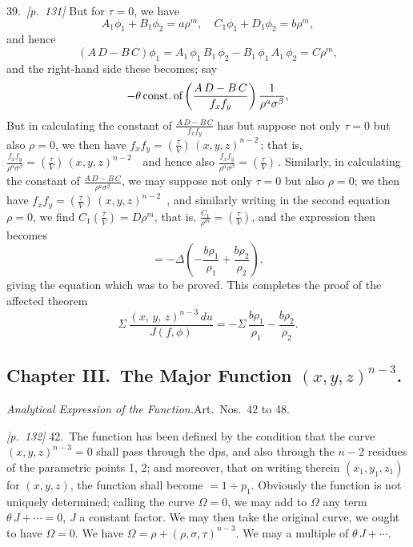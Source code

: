 \documentclass[11pt,a4paper]{article}
\theoremstyle{plain}
\theoremstyle{definition}
\theoremstyle{remark}
\begin{document}
39.\ \textit{[p.~131]} But for $\tau = 0$, we have
\[
A_1 \phi_1 + B_1 \phi_2 = a\rho^{m},\quad C_1 \phi_1 + D_1 \phi_2 = b\rho^{m},
\]
and hence
\[
(A\,D - B\,C)\phi_1 = A_1\,\phi_1\,B_1\,\phi_2 - B_1\,\phi_1\,A_1\,\phi_2 = C\rho^{m},
\]
and the right-hand side these becomes; say
\[
- \theta\,\text{const.\,of}\left(\frac{A\,D - B\,C}{f_x f_y}\right)\frac{1}{\rho^a \sigma^\beta},
\]
But in calculating the constant of $\frac{A\,D - B\,C}{f_x f_y}$ has but suppose not only $\tau = 0$ but also $\rho = 0$, we then have $f_x f_y = \left(\frac{\tau}{V}\right)\,(x, y, z)^{n - 2}\,$; that is, $\frac{f_x f_y}{\rho^a \sigma^\beta} = \left(\frac{\tau}{V}\right)\,(x, y, z)^{n - 2}\,$\,$\,$\, and hence also $\frac{f_x f_y}{\rho^a \sigma^\beta} = \left(\frac{\tau}{V}\right)\,$.
Similarly, in calculating the constant of $\frac{A\,D - B\,C}{\rho^a \sigma^\beta}$, we may suppose not only $\tau = 0$ but also $\rho = 0$; we then have $f_x f_y = \left(\frac{\tau}{V}\right)\,(x, y, z)^{n - 2}$\,$\,$\,, and similarly writing in the second equation $\rho = 0$, we find $C_1\left(\frac{\tau}{V}\right) = D\rho^m$, that is, $\frac{C_1}{\rho^m} = \left(\frac{\tau}{V}\right)$, and the expression then becomes
\[
= -\Delta\left(-\frac{b\rho_1}{\rho_1} + \frac{b\rho_2}{\rho_2}\right),
\]
giving the equation which was to be proved. This completes the proof of the affected theorem
\[
\Sigma\,\frac{(x,\,y,\,z)^{n - 3}\,du}{J(f, \phi)} = -\Sigma\,\frac{b\rho_1}{\rho_1} - \frac{b\rho_2}{\rho_2}.
\]

\subsection*{Chapter III.\ The Major Function $(x, y, z)^{n - 3}$.}

\textit{Analytical Expression of the Function.}\quad Art.\ Nos.~42 to 48.

\noindent\textit{[p.~132]} 42.\ The function has been defined by the condition that the curve $(x, y, z)^{n - 3} = 0$ shall pass through the dps, and also through the $n - 2$ residues of the parametric points 1, 2; and moreover, that on writing therein $(x_1, y_1, z_1)$ for $(x, y, z)$, the function shall become $= 1 \div p_1$. Obviously the function is not uniquely determined; calling the curve $\Omega = 0$, we may add to $\Omega$ any term $\theta\,J + \cdots = 0$, $J$ a constant factor. We may then take the original curve, we ought to have $\Omega = 0$. We have $\Omega = \rho + (\rho, \sigma, \tau)^{n - 3}$. We may a multiple of $\theta\,J + \cdots$.
\end{document}
